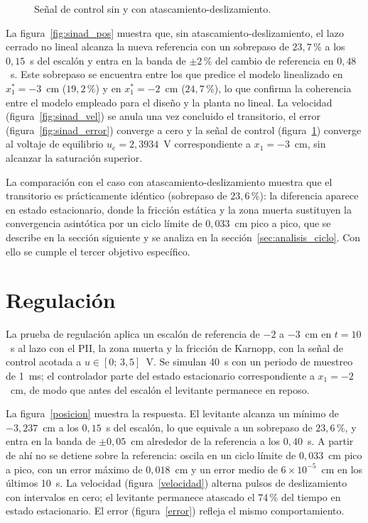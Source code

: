\begin{figure}[ht]
    \centering
    
    \caption[Sin AD: señal de control]{Señal de control sin y con atascamiento-deslizamiento.}
    \label{fig:sinad_ctrl}
\end{figure}

La figura~\ref{fig:sinad_pos} muestra que, sin atascamiento-deslizamiento, el lazo cerrado no lineal alcanza la nueva referencia con un sobrepaso de $23{,}7$\,\% a los $0{,}15$~s del escalón y entra en la banda de $\pm 2$\,\% del cambio de referencia en $0{,}48$~s. Este sobrepaso se encuentra entre los que predice el modelo linealizado en $x_1^*=-3$~cm ($19{,}2$\,\%) y en $x_1^*=-2$~cm ($24{,}7$\,\%), lo que confirma la coherencia entre el modelo empleado para el diseño y la planta no lineal. La velocidad (figura~\ref{fig:sinad_vel}) se anula una vez concluido el transitorio, el error (figura~\ref{fig:sinad_error}) converge a cero y la señal de control (figura~\ref{fig:sinad_ctrl}) converge al voltaje de equilibrio $u_e=2{,}3934$~V correspondiente a $x_1=-3$~cm, sin alcanzar la saturación superior.

La comparación con el caso con atascamiento-deslizamiento muestra que el transitorio es prácticamente idéntico (sobrepaso de $23{,}6$\,\%): la diferencia aparece en estado estacionario, donde la fricción estática y la zona muerta sustituyen la convergencia asintótica por un ciclo límite de $0{,}033$~cm pico a pico, que se describe en la sección siguiente y se analiza en la sección~\ref{sec:analisis_ciclo}. Con ello se cumple el tercer objetivo específico.

\FloatBarrier
\newpage

\section{Regulación}

La prueba de regulación aplica un escalón de referencia de $-2$ a $-3$~cm en $t=10$~s al lazo con el PII, la zona muerta y la fricción de Karnopp, con la señal de control acotada a $u\in[0;\,3{,}5]$~V. Se simulan 40~s con un periodo de muestreo de 1~ms; el controlador parte del estado estacionario correspondiente a $x_1=-2$~cm, de modo que antes del escalón el levitante permanece en reposo.

La figura~\ref{posicion} muestra la respuesta. El levitante alcanza un mínimo de $-3{,}237$~cm a los $0{,}15$~s del escalón, lo que equivale a un sobrepaso de $23{,}6$\,\%, y entra en la banda de $\pm0{,}05$~cm alrededor de la referencia a los $0{,}40$~s. A partir de ahí no se detiene sobre la referencia: oscila en un ciclo límite de $0{,}033$~cm pico a pico, con un error máximo de $0{,}018$~cm y un error medio de $6\times10^{-5}$~cm en los últimos 10~s. La velocidad (figura~\ref{velocidad}) alterna pulsos de deslizamiento con intervalos en cero; el levitante permanece atascado el 74\,\% del tiempo en estado estacionario. El error (figura~\ref{error}) refleja el mismo comportamiento.

